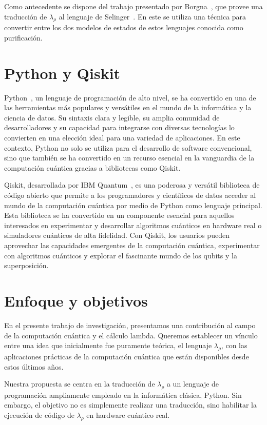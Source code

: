 Como antecedente se dispone del trabajo presentado por Borgna~\cite{agustin}, que provee una traducción de $\lambda_\rho$ al lenguaje de Selinger~\cite{Selinger_2005}. En este se utiliza una técnica para convertir entre los dos modelos de estados de estos lenguajes conocida como purificación.

\section*{Python y Qiskit}
Python~\cite{PythonReference}, un lenguaje de programación de alto nivel, se ha convertido en una de las herramientas más populares y versátiles en el mundo de la informática y la ciencia de datos. Su sintaxis clara y legible, su amplia comunidad de desarrolladores y su capacidad para integrarse con diversas tecnologías lo convierten en una elección ideal para una variedad de aplicaciones. En este contexto, Python no solo se utiliza para el desarrollo de software convencional, sino que también se ha convertido en un recurso esencial en la vanguardia de la computación cuántica gracias a bibliotecas como Qiskit.

Qiskit, desarrollada por IBM Quantum~\cite{ibmquantum}, es una poderosa y versátil biblioteca de código abierto que permite a los programadores y científicos de datos acceder al mundo de la computación cuántica por medio de Python como lenguaje principal. Esta biblioteca se ha convertido en un componente esencial para aquellos interesados en experimentar y desarrollar algoritmos cuánticos en hardware real o simuladores cuánticos de alta fidelidad. Con Qiskit, los usuarios pueden aprovechar las capacidades emergentes de la computación cuántica, experimentar con algoritmos cuánticos y explorar el fascinante mundo de los qubits y la superposición.

\section*{Enfoque y objetivos}

En el presente trabajo de investigación, presentamos una contribución al campo de la computación cuántica y el cálculo lambda. Queremos establecer un vínculo entre una idea que inicialmente fue puramente teórica, el lenguaje $\lambda_\rho$, con las aplicaciones prácticas de la computación cuántica que están disponibles desde estos últimos años.

Nuestra propuesta se centra en la traducción de $\lambda_\rho$ a un lenguaje de programación ampliamente empleado en la informática clásica, Python. Sin embargo, el objetivo no es simplemente realizar una traducción, sino habilitar la ejecución de código de $\lambda_\rho$ en hardware cuántico real.

